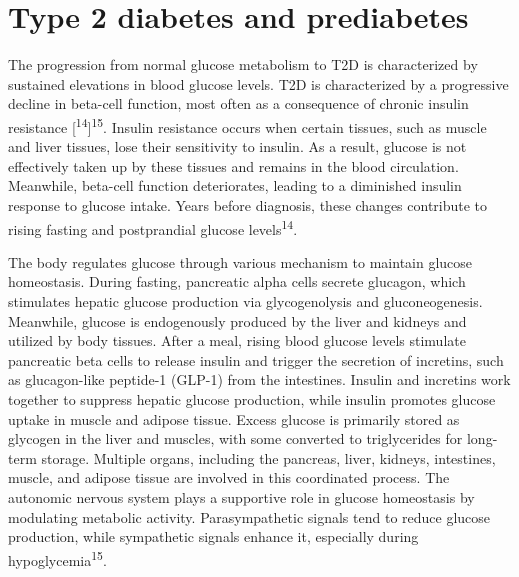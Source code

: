 \documentclass[
  a4paper,
  headsepline=true,
  open=any]{scrbook}
\begin{document}
\hypertarget{type-2-diabetes-and-prediabetes}{%
\section{Type 2 diabetes and
prediabetes}\label{type-2-diabetes-and-prediabetes}}

The progression from normal glucose metabolism to T2D is characterized
by sustained elevations in blood glucose levels. T2D is characterized by
a progressive decline in beta-cell function, most often as a consequence
of chronic insulin resistance
{[}\textsuperscript{14}{]}\textsuperscript{15}. Insulin resistance
occurs when certain tissues, such as muscle and liver tissues, lose
their sensitivity to insulin. As a result, glucose is not effectively
taken up by these tissues and remains in the blood circulation.
Meanwhile, beta-cell function deteriorates, leading to a diminished
insulin response to glucose intake. Years before diagnosis, these
changes contribute to rising fasting and postprandial glucose
levels\textsuperscript{14}.

The body regulates glucose through various mechanism to maintain glucose
homeostasis. During fasting, pancreatic alpha cells secrete glucagon,
which stimulates hepatic glucose production via glycogenolysis and
gluconeogenesis. Meanwhile, glucose is endogenously produced by the
liver and kidneys and utilized by body tissues. After a meal, rising
blood glucose levels stimulate pancreatic beta cells to release insulin
and trigger the secretion of incretins, such as glucagon-like peptide-1
(GLP-1) from the intestines. Insulin and incretins work together to
suppress hepatic glucose production, while insulin promotes glucose
uptake in muscle and adipose tissue. Excess glucose is primarily stored
as glycogen in the liver and muscles, with some converted to
triglycerides for long-term storage. Multiple organs, including the
pancreas, liver, kidneys, intestines, muscle, and adipose tissue are
involved in this coordinated process. The autonomic nervous system plays
a supportive role in glucose homeostasis by modulating metabolic
activity. Parasympathetic signals tend to reduce glucose production,
while sympathetic signals enhance it, especially during
hypoglycemia\textsuperscript{15}.
\end{document}
